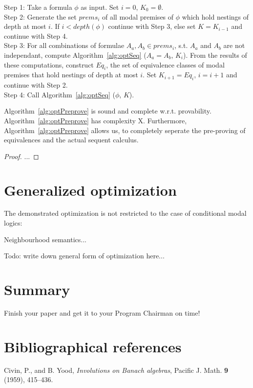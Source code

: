 \documentclass{entcs} \usepackage{entcsmacro}
\begin{document}
\begin{algorithm}[h]
\begin{alg}
  Step 1: Take a formula $\phi$ as input. Set $i=0$, $K_0=\emptyset$.\\
  Step 2: Generate the set $prems_i$ of all modal premises of $\phi$
  which hold nestings of depth at most $i$. If $i<depth(\phi)$ continue
  with Step 3, else set $K=K_{i-1}$ and continue with Step 4.\\
  Step 3: For all combinations of formulae $A_a,A_b\in prems_i$, s.t.
  $A_a$ and $A_b$ are not independant, compute
  Algorithm~\ref{alg:optSeq} ($A_a = A_b$, $K_i$). From the results of these computations,
  construct $Eq_i$, the set of equivalence classes of modal premises that hold
  nestings of depth at most $i$. Set $K_{i+1} = Eq_i$, $i = i + 1$ and
  continue with Step 2.\\
  Step 4: Call Algorithm~\ref{alg:optSeq} ($\phi$, $K$).
\label{alg:optPreprove}
\end{alg}
\end{algorithm}

\begin{proposition}
Algorithm~\ref{alg:optPreprove} is sound and complete w.r.t. provability.
Algorithm~\ref{alg:optPreprove} has complexity X. Furthermore, Algorithm~\ref{alg:optPreprove}
allows us, to completely seperate the pre-proving of equivalences and
the actual sequent calculus.
\end{proposition}
\begin{proof}
...
\end{proof}

\section{Generalized optimization}

The demonstrated optimization is not restricted to the case of conditional
modal logics: 

\begin{example}
Neighbourhood semantics...
\end{example}

Todo: write down general form of optimization here...

\section{Summary}  
\begin{problem}
  Finish your paper and get it to your Program Chairman on time!
\end{problem}

\section{Bibliographical references}\label{references}

\begin{thebibliography}{10}\label{bibliography}
 Civin, P., and B. Yood, \emph{Involutions on Banach
    algebras}, Pacific J. Math. \textbf{9} (1959), 415--436.
  
\end{thebibliography}
\end{document}
